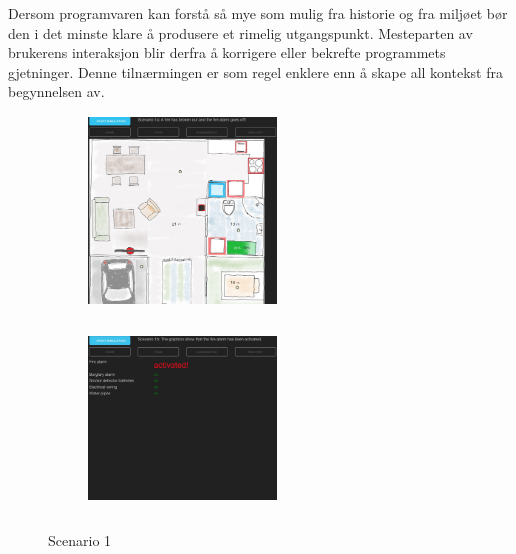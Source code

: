 Dersom programvaren kan forstå så mye som mulig fra historie og fra miljøet bør den i det minste klare å produsere et rimelig utgangspunkt. Mesteparten av brukerens interaksjon blir derfra å korrigere eller bekrefte programmets gjetninger. Denne tilnærmingen er som regel enklere enn å skape all kontekst fra begynnelsen av.
\begin{figure}[ht]
\centering
\begin{subfigure}{0.32\textwidth}
\centering
\includegraphics[width=5cm, height=5cm]{fig/scenario1a}
\caption{}
\label{fig:1a}
\end{subfigure}
\begin{subfigure}{0.32\textwidth}
\centering
\includegraphics[width=5cm, height=5cm]{fig/scenario1b}
\caption{}
\label{fig:1b}
\end{subfigure}
\caption{Scenario 1}
\label{fig:scenario1}
\end{figure}
